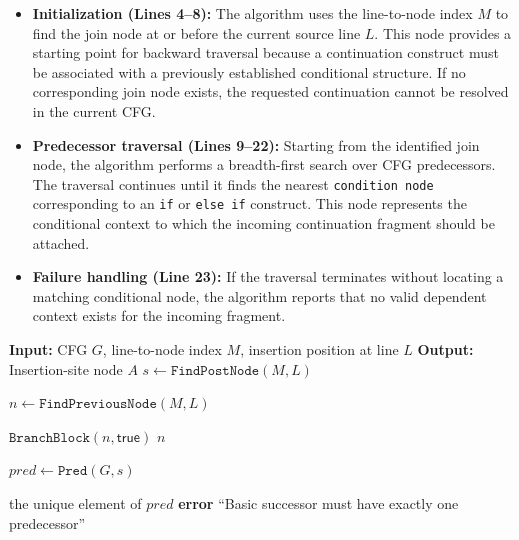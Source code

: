 \documentclass[11pt,oneside]{report}
\theoremstyle{plain}
\theoremstyle{definition}
\theoremstyle{remark}
\begin{document}
\begin{itemize}

\item \textbf{Initialization (Lines 4--8):}
The algorithm uses the line-to-node index \(M\) to find the join node at or before the current source line \(L\).
This node provides a starting point for backward traversal because a continuation construct must be associated with a previously established conditional structure.
If no corresponding join node exists, the requested continuation cannot be resolved in the current CFG.

\item \textbf{Predecessor traversal (Lines 9--22):}
Starting from the identified join node, the algorithm performs a breadth-first search over CFG predecessors.
The traversal continues until it finds the nearest \texttt{condition node} corresponding to an \texttt{if} or \texttt{else if} construct.
This node represents the conditional context to which the incoming continuation fragment should be attached.

\item \textbf{Failure handling (Line 23):}
If the traversal terminates without locating a matching conditional node, the algorithm reports that no valid dependent context exists for the incoming fragment.

\end{itemize}

\begin{algorithm}[!t]
\caption{Independent-Context Lookup}
\label{alg:get-insertion-site}
\begin{algorithmic}[1]
\State \textbf{Input:} CFG $G$, line-to-node index $M$, insertion position at line $L$
\State \textbf{Output:} Insertion-site node $A$
\State $s \gets \texttt{FindPostNode}(M,L)$

\State $n \gets \texttt{FindPreviousNode}(M,L)$

  \State \Return $\texttt{BranchBlock}(n,\mathsf{true})$
\Else
  \State \Return $n$
\EndIf

\Else
\State $pred \gets \texttt{Pred}(G,s)$

  \State \Return the unique element of $pred$
\Else
  \State \textbf{error} ``Basic successor must have exactly one predecessor''
\EndIf

\EndIf
\EndFunction
\end{algorithmic}
\end{algorithm}
\end{document}
